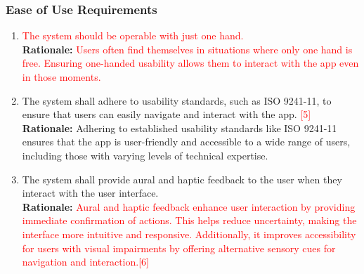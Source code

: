 \documentclass{article}
\begin{document}
\subsubsection{Ease of Use Requirements}
\label{ssub:ease_of_use_requirements}
\begin{enumerate}[{UH-EOU}1. ]
	\item \textcolor{red}{The system should be operable with just one hand.}\\
	\textbf{Rationale:} \textcolor{red}{Users often find themselves in situations where only one hand is free. Ensuring one-handed usability allows them to interact with the app even in those moments.}
	\item The system shall adhere to usability standards, such as ISO 9241-11, to ensure that users can easily navigate and interact with the app. \textcolor{red}{[5]}\\
	\textbf{Rationale:} Adhering to established usability standards like ISO 9241-11 ensures that the app is user-friendly and accessible to a wide range of users, including those with varying levels of technical expertise.
	\item The system shall provide aural and haptic feedback to the user when they interact with the user interface.\\
	\textbf{Rationale:} \textcolor{red}{Aural and haptic feedback enhance user interaction by providing immediate confirmation of actions. This helps reduce uncertainty, making the interface more intuitive and responsive. Additionally, it improves accessibility for users with visual impairments by offering alternative sensory cues for navigation and interaction.[6]}\\
\end{enumerate}
\end{document}
